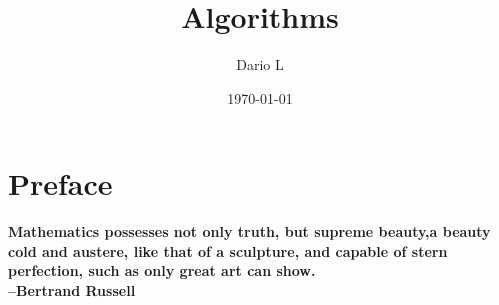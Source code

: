 \documentclass[a4paper,11pt]{book}
\author{Dario L}
\title{Algorithms}
\date{\today}
\begin{document}
\frontmatter
\maketitle

\chapter*{Preface}
\textbf{Mathematics possesses not only truth, but supreme beauty,a beauty cold and austere, like that of a sculpture,
and capable of stern perfection, such as only great art can show.\\ --Bertrand Russell}



\tableofcontents

\mainmatter



\end{document}
